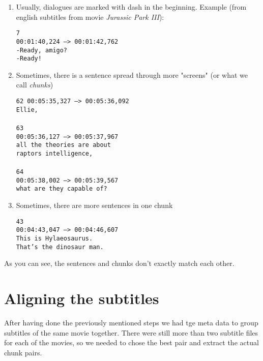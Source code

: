 \begin{enumerate}
    \item Usually, dialogues are marked with dash in the beginning. Example (from english subtitles from movie \emph{Jurassic Park III}):
    
        \texttt{7 \\
        00:01:40,224 --> 00:01:42,762 \\
        -Ready, amigo? \\
        -Ready!}
        
    \item Sometimes, there is a sentence spread through more "screens" (or what we call \emph{chunks})
    
    \texttt{62
    00:05:35,327 --> 00:05:36,092\\
    Ellie,\\
\\
    63\\
    00:05:36,127 --> 00:05:37,967\\
    all the theories are about\\
    raptors intelligence,\\
\\
    64\\
    00:05:38,002 --> 00:05:39,567\\
    what are they capable of?}
    
    \item Sometimes, there are more sentences in one chunk
    
    \texttt{43\\
    00:04:43,047 --> 00:04:46,607\\
    This is Hylaeosaurus.\\
    That's the dinosaur man.}
    
\end{enumerate}

As you can see, the sentences and chunks don't exactly match each other.

\section{Aligning the subtitles}
\label{sec:aligning_subtitles}

After having done the previously mentioned steps we had tge meta data to group subtitles of the same movie together. There were still more than two subtitle files for each of the movies, so we needed to chose the best pair and extract the actual chunk pairs.

